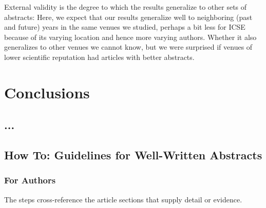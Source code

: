 \documentclass[10pt,journal,compsoc]{IEEEtran}
\begin{document}
External validity is the degree to which the results generalize
to other sets of abstracts:
Here, we expect that our results generalize well to
neighboring (past and future) years in the same venues
we studied, perhaps a bit less for ICSE because of its
varying location and hence more varying authors.
Whether it also generalizes to other venues
we cannot know, but we were surprised if venues of lower
scientific reputation had articles with better abstracts.


\section{Conclusions}


\subsection{...}
\noindent


\subsection{How To: Guidelines for Well-Written Abstracts}

\subsubsection{For Authors}

The steps cross-reference the article sections that supply 
detail or evidence.
\end{document}
